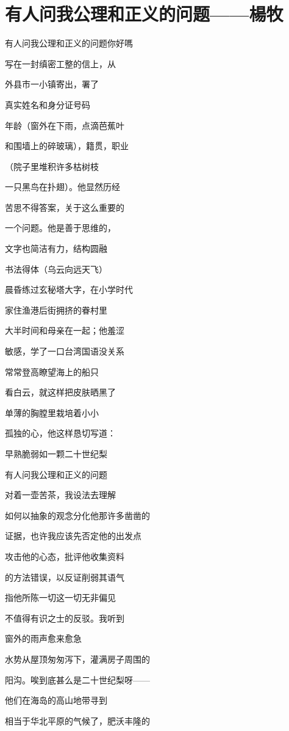 \section{有人问我公理和正义的问题——楊牧}

有人问我公理和正义的问题你好嗎

写在一封缜密工整的信上，从

外县市一小镇寄出，署了

真实姓名和身分证号码

年龄（窗外在下雨，点滴芭蕉叶

和围墙上的碎玻璃），籍贯，职业

（院子里堆积许多枯树枝

一只黑鸟在扑翅）。他显然历经

苦思不得答案，关于这么重要的

一个问题。他是善于思维的，

文字也简洁有力，结构圆融

书法得体（乌云向远天飞）

晨昏练过玄秘塔大字，在小学时代

家住渔港后街拥挤的眷村里

大半时间和母亲在一起；他羞涩

敏感，学了一口台湾国语没关系

常常登高瞭望海上的船只

看白云，就这样把皮肤晒黑了

单薄的胸膛里栽培着小小

孤独的心，他这样恳切写道：

早熟脆弱如一颗二十世纪梨



有人问我公理和正义的问题

对着一壶苦茶，我设法去理解

如何以抽象的观念分化他那许多凿凿的

证据，也许我应该先否定他的出发点

攻击他的心态，批评他收集资料

的方法错误，以反证削弱其语气

指他所陈一切这一切无非偏见

不值得有识之士的反驳。我听到

窗外的雨声愈来愈急

水势从屋顶匆匆泻下，灌满房子周围的

阳沟。唉到底甚么是二十世纪梨呀——

他们在海岛的高山地带寻到

相当于华北平原的气候了，肥沃丰隆的

